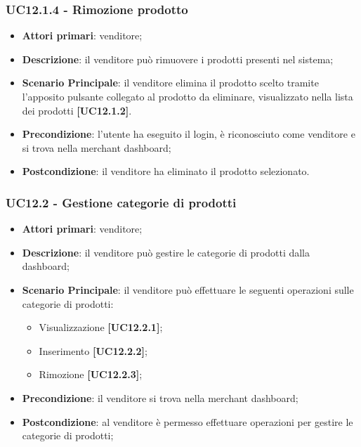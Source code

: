 \subsubsection{UC12.1.4 - Rimozione prodotto}
\begin{itemize}
\item \textbf{Attori primari}: venditore;
\item \textbf{Descrizione}: il venditore può rimuovere i prodotti presenti nel sistema;
\item \textbf{Scenario Principale}: il venditore elimina il prodotto scelto tramite l'apposito pulsante collegato al prodotto da eliminare, visualizzato nella lista dei prodotti \textbf{[UC12.1.2]}.
\item \textbf{Precondizione}: l'utente ha eseguito il login, è riconosciuto come venditore e si trova nella merchant dashboard;
\item \textbf{Postcondizione}: il venditore ha eliminato il prodotto selezionato.
\end{itemize}

\subsubsection{UC12.2 - Gestione categorie di prodotti}
\begin{itemize}
\item \textbf{Attori primari}: venditore;
\item \textbf{Descrizione}: il venditore può gestire le categorie di prodotti dalla dashboard;
\item \textbf{Scenario Principale}: il venditore può effettuare le seguenti operazioni sulle categorie di prodotti:
\begin{itemize}
	\item Visualizzazione \textbf{[UC12.2.1]};
	\item Inserimento \textbf{[UC12.2.2]};
	\item Rimozione \textbf{[UC12.2.3]};
\end{itemize}
\item \textbf{Precondizione}: il venditore si trova nella merchant dashboard;
\item \textbf{Postcondizione}: al venditore è permesso effettuare operazioni per gestire le categorie di prodotti;
\end{itemize}


